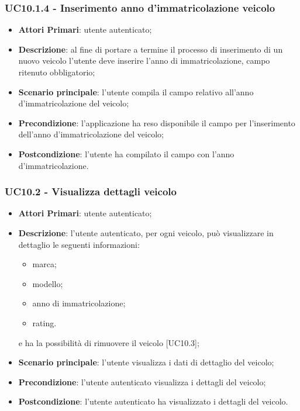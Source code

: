 \subsubsection{UC10.1.4 - Inserimento anno d'immatricolazione veicolo}
\begin{itemize}
	\item \textbf{Attori Primari}: utente autenticato;
	\item \textbf{Descrizione}: al fine di portare a termine il processo di inserimento di un nuovo veicolo l'utente deve inserire l'anno di immatricolazione, campo ritenuto obbligatorio;
	\item \textbf{Scenario principale}: l'utente compila il campo relativo all'anno d'immatricolazione del veicolo;	
	\item \textbf{Precondizione}: l'applicazione ha reso disponibile il campo per l'inserimento dell'anno d'immatricolazione del veicolo;
	\item \textbf{Postcondizione}: l'utente ha compilato il campo con l'anno d'immatricolazione.	
\end{itemize}
\subsubsection{UC10.2 - Visualizza dettagli veicolo}
\begin{itemize}
	\item \textbf{Attori Primari}: utente autenticato;
	\item \textbf{Descrizione}: l'utente autenticato, per ogni veicolo, può visualizzare in dettaglio le seguenti informazioni:
	\begin{itemize}
		\item marca;
		\item modello;
		\item anno di immatricolazione;
		\item rating.
	\end{itemize}
	e ha la possibilità di rimuovere il veicolo [UC10.3];
	\item \textbf{Scenario principale}: l'utente visualizza i dati di dettaglio del veicolo;
	\item \textbf{Precondizione}: l'utente autenticato visualizza i dettagli del veicolo;
	\item \textbf{Postcondizione}: l'utente autenticato ha visualizzato i dettagli del veicolo.
\end{itemize}
